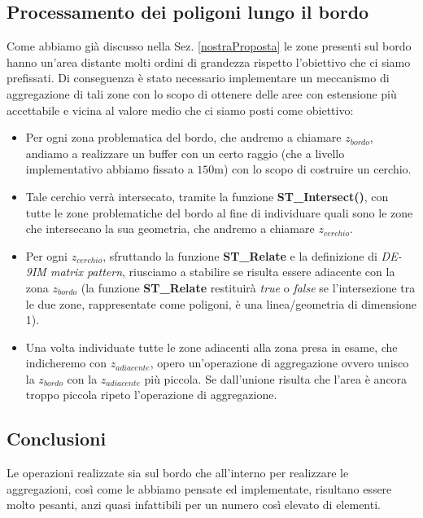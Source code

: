 \subsection{Processamento dei poligoni lungo il bordo}
Come abbiamo già discusso nella Sez. \ref{nostraProposta} le zone presenti sul bordo hanno un'area distante molti ordini di grandezza rispetto l'obiettivo che ci siamo prefissati. Di conseguenza è stato necessario implementare un meccanismo di aggregazione di tali zone con lo scopo di ottenere delle aree con estensione più accettabile e vicina al valore medio che ci siamo posti come obiettivo: \newline
\begin{itemize}
\item Per ogni zona problematica del bordo, che andremo a chiamare $z_{bordo}$, andiamo a realizzare un buffer con un certo raggio (che a livello implementativo abbiamo fissato a $150$m) con lo scopo di costruire un cerchio.
\item Tale cerchio verrà intersecato, tramite la funzione \textbf{ST\_Intersect()}, con tutte le zone problematiche del bordo al fine di individuare quali sono le zone che intersecano la sua geometria, che andremo a chiamare $z_{cerchio}$.
\item Per ogni $z_{cerchio}$, sfruttando la funzione \textbf{ST\_Relate} e la definizione di \textit{DE-9IM matrix pattern}, riusciamo a stabilire se risulta essere adiacente con la zona $z_{bordo}$ (la funzione \textbf{ST\_Relate} restituirà \textit{true} o \textit{false} se l'intersezione tra le due zone, rappresentate come poligoni, è una linea/geometria di dimensione 1).
\item Una volta individuate tutte le zone adiacenti alla zona presa in esame, che indicheremo con $z_{adiacente}$, opero un'operazione di aggregazione ovvero unisco la $z_{bordo}$ con la $z_{adiacente}$ più piccola. Se dall'unione risulta che l'area è ancora troppo piccola ripeto l'operazione di aggregazione.
\end{itemize}
\subsection{Conclusioni}
Le operazioni realizzate sia sul bordo che all’interno per realizzare le aggregazioni, così come le abbiamo pensate ed implementate, risultano essere molto pesanti, anzi quasi infattibili per un numero così elevato di elementi.

